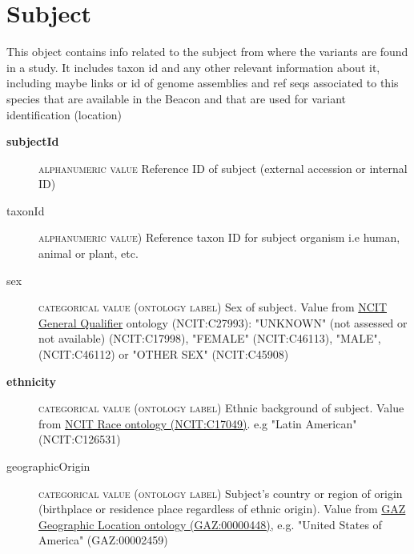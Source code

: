 \documentclass[a4paper, 10pt]{article}        %
\begin{document}
\section*{{\color{teal} Subject}}
This object contains info related to the subject from where the variants are found in a study. It includes taxon id and any other relevant information about it, including maybe links or id of genome assemblies and ref seqs associated to this species that are available in the Beacon and that are used for variant identification (location)
\begin{description}
	\item[\textbf{subjectId}]  {\textsc{alphanumeric value}} Reference ID of subject (external accession or internal ID)
	\item[taxonId] {\textsc{alphanumeric value)}} Reference taxon ID for subject organism i.e human, animal or plant, etc.
	\item[sex] {\textsc{categorical value (ontology label)}} Sex of subject. Value from \href{https://www.ebi.ac.uk/ols/ontologies/ncit/terms?iri=http%3A%2F%2Fpurl.obolibrary.org%2Fobo%2FNCIT_C27993&viewMode=All&siblings=false}{NCIT General Qualifier} ontology (NCIT:C27993): "UNKNOWN" (not assessed or not available) (NCIT:C17998), "FEMALE" (NCIT:C46113), "MALE", (NCIT:C46112) or "OTHER SEX" (NCIT:C45908)
	\item[\textbf{ethnicity}] {\textsc{categorical value (ontology label)}} Ethnic background of subject. Value from \href{https://www.ebi.ac.uk/ols/ontologies/ncit/terms?iri=http%3A%2F%2Fpurl.obolibrary.org%2Fobo%2FNCIT_C17049}{NCIT Race ontology (NCIT:C17049)}. e.g "Latin American" (NCIT:C126531)
	\item[geographicOrigin] {\textsc{categorical value (ontology label)}} Subject's country or region of origin (birthplace or residence place regardless of ethnic origin). Value from \href{https://www.ebi.ac.uk/ols/ontologies/gaz/terms?iri=http%3A%2F%2Fpurl.obolibrary.org%2Fobo%2FGAZ_00000448}{GAZ Geographic Location ontology (GAZ:00000448)}, e.g. "United States of America" (GAZ:00002459)

\end{description}
\end{document}
